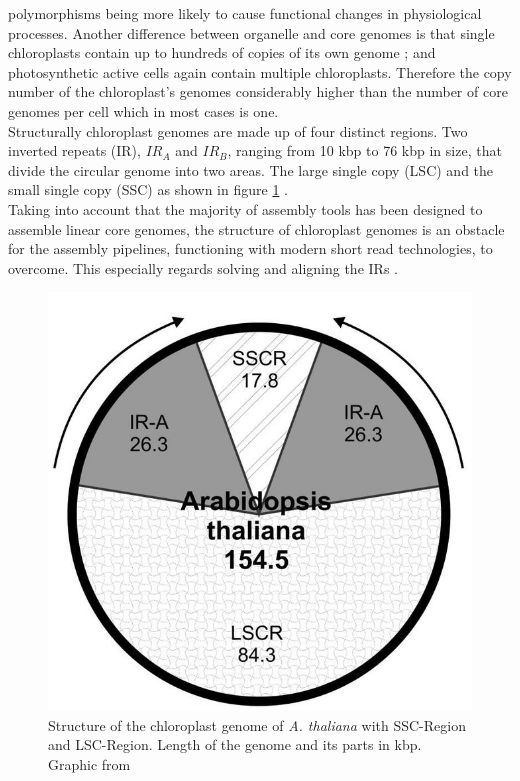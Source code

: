 polymorphisms being more likely to cause functional changes in physiological processes. Another difference
between organelle and core genomes is that single chloroplasts contain up to hundreds of copies of its own
genome \cite{kumar_2014}; \cite{bendich_1987} and photosynthetic active cells again contain multiple
chloroplasts.
Therefore the copy number of the chloroplast's genomes considerably higher than the number of core genomes per cell which in most cases is one. \\
Structurally chloroplast genomes are made up of four distinct regions. Two inverted repeats (IR), $IR_A$ and
$IR_B$, ranging from 10 kbp to 76 kbp in size, that divide the circular genome into two areas. The large
single copy (LSC) and the small single copy (SSC) as shown in figure \ref{fig:cpast_genome} \cite{palmer_1985}.\\
Taking into account that the majority of assembly tools has been designed to assemble linear core genomes, the
structure of chloroplast genomes is an obstacle for the assembly pipelines, functioning with modern short
read technologies, to overcome. This especially regards solving and aligning the IRs \cite{Wang2018}.

\begin{figure}[H]
\centering
\includegraphics[height=.55\textheight, width=.95\textwidth]{Figures/cpast}
\decoRule
\caption[Structure of a chloroplast genome]{Structure of the chloroplast genome of \textit{A. thaliana} with SSC-Region and LSC-Region. Length of the genome and its parts in kbp. Graphic from \cite{olejniczak2016chloroplasts}}
\label{fig:cpast_genome}
\end{figure}

